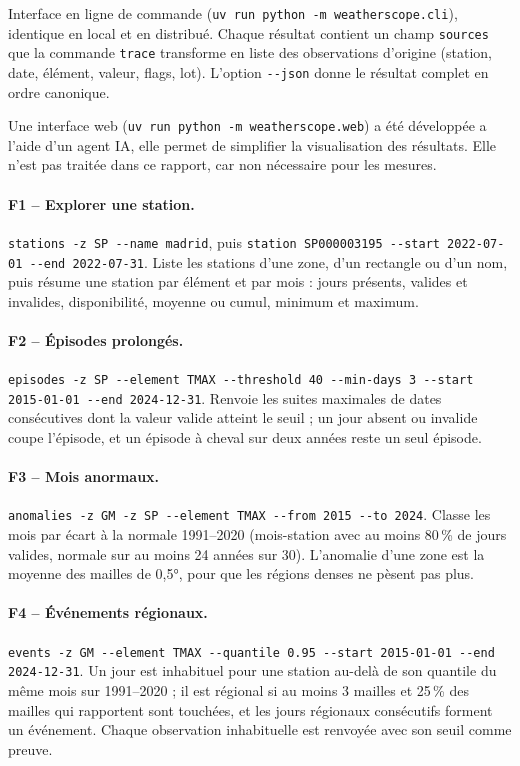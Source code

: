 \documentclass{rapportClass}
\newcommand{\cmd}[1]{\texttt{#1}}
\begin{document}
Interface en ligne de commande (\cmd{uv run python -m weatherscope.cli}), identique en local et en distribué.
Chaque résultat contient un champ \cmd{sources} que la commande \cmd{trace} transforme en liste des observations
d'origine (station, date, élément, valeur, flags, lot). L'option \cmd{-{}-json} donne le résultat complet
en ordre canonique.

Une interface web (\cmd{uv run python -m weatherscope.web}) a été développée a l'aide d'un agent IA, elle permet de simplifier
la visualisation des résultats. Elle n'est pas traitée dans ce rapport, car non nécessaire pour les mesures. 

\paragraph{F1 -- Explorer une station.} \cmd{stations -z SP -{}-name madrid}, puis
\cmd{station SP000003195 -{}-start 2022-07-01 -{}-end 2022-07-31}. Liste les stations d'une zone, d'un rectangle
ou d'un nom, puis résume une station par élément et par mois : jours présents, valides et invalides,
disponibilité, moyenne ou cumul, minimum et maximum.

\paragraph{F2 -- Épisodes prolongés.} \cmd{episodes -z SP -{}-element TMAX -{}-threshold 40 -{}-min-days 3
-{}-start 2015-01-01 -{}-end 2024-12-31}. Renvoie les suites maximales de dates consécutives dont la valeur valide
atteint le seuil ; un jour absent ou invalide coupe l'épisode, et un épisode à cheval sur deux années reste un seul
épisode.

\paragraph{F3 -- Mois anormaux.} \cmd{anomalies -z GM -z SP -{}-element TMAX -{}-from 2015 -{}-to 2024}. Classe
les mois par écart à la normale 1991--2020 (mois-station avec au moins 80\,\% de jours valides, normale sur au
moins 24 années sur 30). L'anomalie d'une zone est la moyenne des mailles de 0,5°, pour que les régions denses ne
pèsent pas plus.

\paragraph{F4 -- Événements régionaux.} \cmd{events -z GM -{}-element TMAX -{}-quantile 0.95
-{}-start 2015-01-01 -{}-end 2024-12-31}. Un jour est inhabituel pour une station au-delà de son quantile du même
mois sur 1991--2020 ; il est régional si au moins 3 mailles et 25\,\% des mailles qui rapportent sont touchées, et
les jours régionaux consécutifs forment un événement. Chaque observation inhabituelle est renvoyée avec son seuil
comme preuve.
\end{document}
